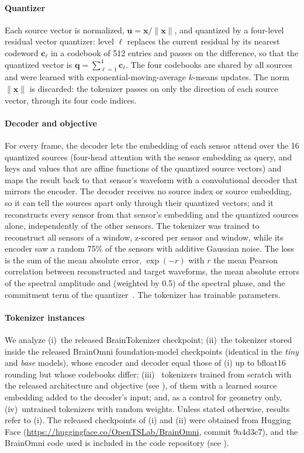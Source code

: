 \documentclass[10pt,letterpaper]{article}
\newcommand{\uvec}{\bm{u}}
\begin{document}
\paragraph*{Quantizer} Each source vector is normalized,
$\uvec=\bm{x}/\lVert\bm{x}\rVert$, and quantized by a four-level residual vector
quantizer: level $\ell$ replaces the current residual by its nearest codeword
$\bm{c}_\ell$ in a codebook of 512 entries and passes on the difference, so that the
quantized vector is $\bm{q}=\sum_{\ell=1}^{4}\bm{c}_\ell$. The four codebooks are
shared by all sources and were learned with exponential-moving-average $k$-means
updates. The norm $\lVert\bm{x}\rVert$ is discarded: the tokenizer passes on only the
direction of each source vector, through its four code indices.

\paragraph*{Decoder and objective} For every frame, the decoder lets the embedding of
each sensor attend over the 16 quantized sources (four-head attention with the sensor
embedding as query, and keys and values that are affine functions of the quantized
source vectors) and maps the result back to that sensor's waveform with a convolutional
decoder that mirrors the encoder. The decoder receives no source index or source
embedding, so it can tell the sources apart only through their quantized vectors; and it
reconstructs every sensor from that sensor's embedding and
the quantized sources alone, independently of the other sensors. The tokenizer was
trained to reconstruct all sensors of a window, z-scored per sensor and window, while
its encoder saw a random 75\% of the sensors with additive Gaussian noise. The loss is
the sum of the mean absolute error, $\exp(-r)$ with $r$ the mean Pearson correlation
between reconstructed and target waveforms, the mean absolute errors of the spectral
amplitude and (weighted by 0.5) of the spectral phase, and the commitment term of the
quantizer~\cite{brainomni2025}. The tokenizer has \NumParams{} trainable parameters.

\paragraph*{Tokenizer instances} We analyze (i)~the released BrainTokenizer checkpoint;
(ii)~the tokenizer stored inside the released BrainOmni foundation-model checkpoints
(identical in the \emph{tiny} and \emph{base} models), whose encoder and decoder equal
those of (i) up to bfloat16 rounding but whose codebooks differ; (iii)~\NumReplicas{}
tokenizers trained from scratch with the released architecture and objective
(see ), \NumVariants{} of them with a learned source embedding added to the
decoder's input; and, as a control for geometry only, (iv)~untrained tokenizers with
random weights. Unless stated otherwise, results refer to (i). The released checkpoints of (i) and (ii) were
obtained from Hugging Face (\url{https://huggingface.co/OpenTSLab/BrainOmni}, commit 9a4d3c7), and the
BrainOmni code used is included in the code repository (see ).
\end{document}
